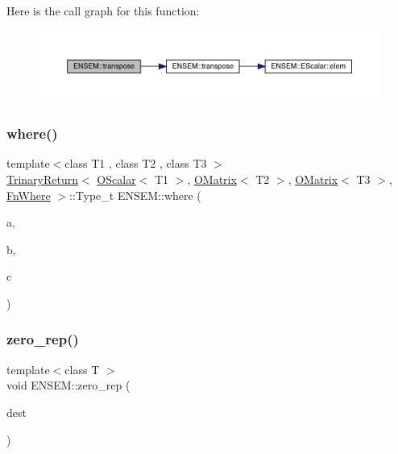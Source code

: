 Here is the call graph for this function\+:\nopagebreak
\begin{figure}[H]
\begin{center}
\leavevmode
\includegraphics[width=350pt]{d8/d55/group__obsmatrix_gae3097e7f8ff8914a37a874367aed476b_cgraph}
\end{center}
\end{figure}
\mbox{\label{group__obsmatrix_ga9938a7a656eaaa3617a11303334942ef}} 
\subsubsection{\texorpdfstring{where()}{where()}}
{\footnotesize\ttfamily template$<$class T1 , class T2 , class T3 $>$ \\
\mbox{\hyperlink{structENSEM_1_1TrinaryReturn}{Trinary\+Return}}$<$ \mbox{\hyperlink{classENSEM_1_1OScalar}{O\+Scalar}}$<$ T1 $>$, \mbox{\hyperlink{classENSEM_1_1OMatrix}{O\+Matrix}}$<$ T2 $>$, \mbox{\hyperlink{classENSEM_1_1OMatrix}{O\+Matrix}}$<$ T3 $>$, \mbox{\hyperlink{structENSEM_1_1FnWhere}{Fn\+Where}} $>$\+::Type\+\_\+t E\+N\+S\+E\+M\+::where (\begin{DoxyParamCaption}\item[{const \mbox{\hyperlink{classENSEM_1_1OScalar}{O\+Scalar}}$<$ T1 $>$ \&}]{a,  }\item[{const \mbox{\hyperlink{classENSEM_1_1OMatrix}{O\+Matrix}}$<$ T2 $>$ \&}]{b,  }\item[{const \mbox{\hyperlink{classENSEM_1_1OMatrix}{O\+Matrix}}$<$ T3 $>$ \&}]{c }\end{DoxyParamCaption})\hspace{0.3cm}{\ttfamily [inline]}}

\mbox{\label{group__obsmatrix_gaf3d502e6c7fccd147d8023eda09b31b4}} 
\subsubsection{\texorpdfstring{zero\_rep()}{zero\_rep()}}
{\footnotesize\ttfamily template$<$class T $>$ \\
void E\+N\+S\+E\+M\+::zero\+\_\+rep (\begin{DoxyParamCaption}\item[{\mbox{\hyperlink{classENSEM_1_1OMatrix}{O\+Matrix}}$<$ T $>$ \&}]{dest }\end{DoxyParamCaption})\hspace{0.3cm}{\ttfamily [inline]}}



